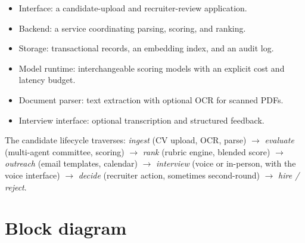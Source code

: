 \documentclass[11pt,oneside]{scrbook}
\begin{document}
\begin{itemize}
  \item Interface: a candidate-upload and recruiter-review application.
  \item Backend: a service coordinating parsing, scoring, and ranking.
  \item Storage: transactional records, an embedding index, and an audit log.
  \item Model runtime: interchangeable scoring models with an explicit
        cost and latency budget.
  \item Document parser: text extraction with optional OCR for scanned PDFs.
  \item Interview interface: optional transcription and structured feedback.
\end{itemize}

The candidate lifecycle traverses: \emph{ingest} (CV upload, OCR, parse) $\to$
\emph{evaluate} (multi-agent committee, scoring) $\to$ \emph{rank}
(rubric engine, blended score) $\to$ \emph{outreach} (email templates,
calendar) $\to$ \emph{interview} (voice or in-person, with the voice
interface) $\to$ \emph{decide} (recruiter action, sometimes second-round) $\to$
\emph{hire / reject}.

\section{Block diagram}
\end{document}
